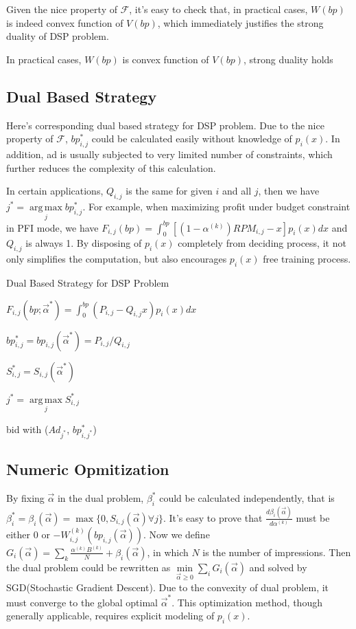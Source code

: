 \documentclass[sigconf]{acmart}
\DeclareMathOperator*{\argmax}{arg\,max}
\newcommand{\sbp}{bp_{i,j}}
\newcommand{\sW}{W_{i,j}^{(k)}}
\newcommand{\sB}{B^{(k)}}
\newcommand{\sRPM}{RPM_{i,j}}
\newcommand{\salpha}{\alpha^{(k)}}
\newcommand{\sbeta}{\beta_i}
\newcommand{\sF}{F_{i,j}}
\newcommand{\sS}{S_{i,j}}
\newcommand{\sG}{G_i}
\newcommand{\valpha}{\vec{\alpha}}
\newcommand{\uff}{\mathscr{F}}
\begin{document}
Given the nice property of $\uff$, it's easy to check that, in practical cases, $W(bp)$ is indeed convex function of $V(bp)$,
    which immediately justifies the strong duality of DSP problem.

\begin{theorem}
In practical cases, $W(bp)$ is convex function of $V(bp)$, strong duality holds
\end{theorem}

\subsection{Dual Based Strategy}

Here's corresponding dual based strategy for DSP problem.
Due to the nice property of $\uff$, $\sbp^*$ could be calculated easily without knowledge of $p_i(x)$.
In addition, ad is usually subjected to very limited number of constraints, which further reduces the complexity of this calculation.

In certain applications, $Q_{i,j}$ is the same for given $i$ and all $j$, then we have $j^* = \argmax\limits_j \sbp^*$.
For example, when maximizing profit under budget constraint in PFI mode,
    we have $\sF(bp) = \int_0^{bp} [(1-\salpha)\sRPM-x]p_i(x)dx$ and $Q_{i,j}$ is always 1.
By disposing of $p_i(x)$ completely from deciding process, it not only simplifies the computation,
    but also encourages $p_i(x)$ free training process.

\begin{algorithm}
\caption{Dual Based Strategy for DSP Problem}

{
  {
    $\sF(bp; \valpha^*) = \int_0^{bp} (P_{i,j}-Q_{i,j}x)p_i(x)dx$

    $\sbp^* = \sbp(\valpha^*) = P_{i,j}/Q_{i,j}$

    $\sS^* = \sS(\valpha^*)$
  }
  $j^* = \argmax\limits_j \sS^*$
  
   { bid with ($Ad_{j^*}$, $bp_{i,j^*}^*$) }
}
\end{algorithm}

\subsection{Numeric Opmitization}

By fixing $\valpha$ in the dual problem, $\sbeta^*$ could be calculated independently,
    that is $\sbeta^* = \sbeta(\valpha) = \max \{ 0, \sS(\valpha) \forall j \}$.
It's easy to prove that $\frac{d\sbeta(\valpha)}{d\salpha}$ must be either $0$ or $-\sW(\sbp(\valpha))$.
Now we define $\sG(\valpha) = \sum\limits_k \frac{\salpha \sB}{N} + \sbeta(\valpha)$, in which $N$ is the number of impressions.
Then the dual problem could be rewritten as $\min\limits_{\valpha \ge 0} \sum\limits_i \sG(\valpha)$
    and solved by SGD(Stochastic Gradient Descent).
Due to the convexity of dual problem, it must converge to the global optimal $\valpha^*$.
This optimization method, though generally applicable, requires explicit modeling of $p_i(x)$.
\end{document}
